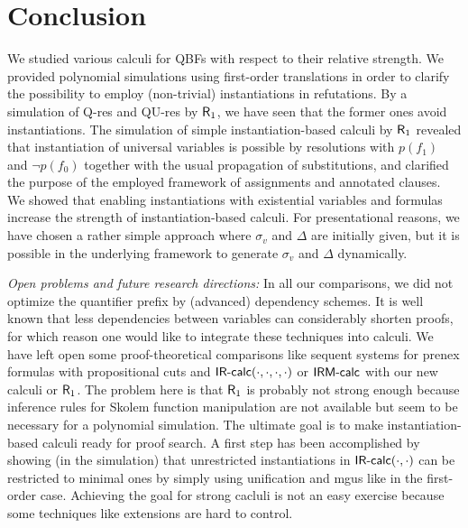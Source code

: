 \documentclass{llncs}
\newcommand{\qres}{\mbox{\sf Q-res}}
\newcommand{\qures}{\mbox{\sf QU-res}}
\newcommand{\Rfo}{$\mbox{\sf R}_1$}
\newcommand{\IRcalcPM}[2]{$\mbox{\sf IR-calc}(#1,#2)$}
\newcommand{\IRcalcPMDSubst}[4]{$\mbox{\sf IR-calc}(#1,#2,#3,#4)$}
\newcommand{\IRMcalc}{$\mbox{\sf IRM-calc}$}
\begin{document}
\section{Conclusion}\label{sec:concl}


We studied various calculi for QBFs with respect to their relative
strength. We provided polynomial simulations using first-order
translations in order to clarify the possibility to employ
(non-trivial) instantiations in refutations.  By a simulation of
\qres{} and \qures{} by \Rfo, we have seen that the former ones avoid
instantiations.  The simulation of simple instantiation-based calculi
by \Rfo{} revealed that instantiation of universal variables is
possible by resolutions with $p(f_1)$ and $\neg p(f_0)$ together with
the usual propagation of substitutions, and clarified the purpose of
the employed framework of assignments and annotated clauses. We showed
that enabling instantiations with existential variables and formulas
increase the strength of instantiation-based calculi. For
presentational reasons, we have chosen a rather simple approach where
$\sigma_v$ and $\Delta$ are initially given, but it is possible in the
underlying framework to generate $\sigma_v$ and $\Delta$ dynamically.

\medskip
\noindent
\emph{Open problems and future research directions:} 
In all our comparisons, we did not optimize the quantifier prefix by
(advanced) dependency schemes. It is well known that less dependencies
between variables can considerably shorten proofs, for which reason
one would like to integrate these techniques into calculi. We have
left open some proof-theoretical comparisons like sequent systems for
prenex formulas with propositional cuts and
\IRcalcPMDSubst{\cdot}{\cdot}{\cdot}{\cdot} or \IRMcalc{}
\cite{DBLP:conf/mfcs/BeyersdorffCJ14} with our new calculi or
\Rfo. The problem here is that \Rfo{} is probably not strong enough
because inference rules for Skolem function manipulation
\cite{Eder:1992,DBLP:books/el/RV01/BaazEL01} are not available but
seem to be necessary for a polynomial simulation.  The ultimate goal
is to make instantiation-based calculi ready for proof search.  A
first step has been accomplished by showing (in the simulation) that
unrestricted instantiations in \IRcalcPM{\cdot}{\cdot} can be
restricted to minimal ones by simply using unification and mgus like
in the first-order case.  Achieving the goal for strong cacluli is not
an easy exercise because some techniques like extensions are hard to
control.
\end{document}
